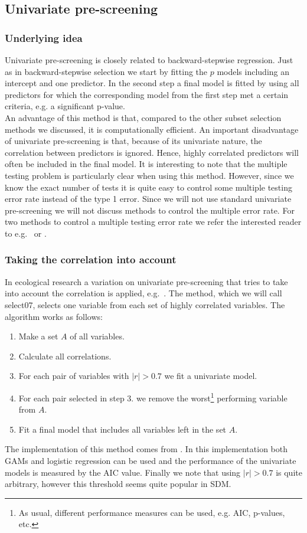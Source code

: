 \subsection{Univariate pre-screening}
\subsubsection{Underlying idea}
Univariate pre-screening is closely related to backward-stepwise regression. Just as in backward-stepwise selection we start by fitting the $p$ models including an intercept and one predictor. In the second step a final model is fitted by using all predictors for which the corresponding model from the first step met a certain criteria, e.g. a significant p-value. \\

An advantage of this method is that, compared to the other subset selection methods we discussed, it is computationally efficient. 
An important disadvantage of univariate pre-screening is that, because of its univariate nature, the correlation between predictors is ignored. Hence, highly correlated predictors will often be included in the final model. It is interesting to note that the multiple testing problem is particularly clear when using this method. However, since we know the exact number of tests it is quite easy to control some multiple testing error rate instead of the type 1 error. Since we will not use standard univariate pre-screening we will not discuss methods to control the multiple error rate. For two methods to control a multiple testing error rate we refer the interested reader to e.g.\ \cite{holm_simple_1979} or \cite{benjamini_controlling_1995}.

\subsubsection{Taking the correlation into account}
In ecological research a variation on univariate pre-screening that tries to take into account the correlation is applied, e.g.\ \cite{cord_remote_2014}. The method, which we will call select07, selects one variable from each set of highly correlated variables. The algorithm works as follows:
\begin{enumerate}
\item Make a set $A$ of all variables.
\item Calculate all correlations.
\item For each pair of variables with $|r| > 0.7$ we fit a univariate model.
\item For each pair selected in step 3. we remove the worst\footnote{As usual, different performance measures can be used, e.g. AIC, p-values, etc.} performing variable from $A$.
\item Fit a final model that includes all variables left in the set $A$.
\end{enumerate}
The implementation of this method comes from \cite{dormann_collinearity:_2013}. In this implementation both GAMs and logistic regression can be used and the performance of the univariate models is measured by the AIC value. Finally we note that using $|r| > 0.7$ is quite arbitrary, however this threshold seems quite popular in SDM.

